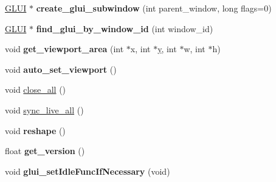 \begin{DoxyCompactItemize}
\item 
\hypertarget{class_g_l_u_i___master___object_a124da0ebe0097f3a3b2490b871c5c7a7}{\hyperlink{class_g_l_u_i}{G\+L\+U\+I} $\ast$ {\bfseries create\+\_\+glui\+\_\+subwindow} (int parent\+\_\+window, long flags=0)}\label{class_g_l_u_i___master___object_a124da0ebe0097f3a3b2490b871c5c7a7}

\item 
\hypertarget{class_g_l_u_i___master___object_ae6910731efd0ad41430ded9e88aa8315}{\hyperlink{class_g_l_u_i}{G\+L\+U\+I} $\ast$ {\bfseries find\+\_\+glui\+\_\+by\+\_\+window\+\_\+id} (int window\+\_\+id)}\label{class_g_l_u_i___master___object_ae6910731efd0ad41430ded9e88aa8315}

\item 
\hypertarget{class_g_l_u_i___master___object_a2bee4bcbf463ab57f6da65eeb9a93ee8}{void {\bfseries get\+\_\+viewport\+\_\+area} (int $\ast$x, int $\ast$\hyperlink{_ice_utils_8h_aa7ffaed69623192258fb8679569ff9ba}{y}, int $\ast$w, int $\ast$h)}\label{class_g_l_u_i___master___object_a2bee4bcbf463ab57f6da65eeb9a93ee8}

\item 
\hypertarget{class_g_l_u_i___master___object_ad62e7468e51d92ac67617f1968b1c944}{void {\bfseries auto\+\_\+set\+\_\+viewport} ()}\label{class_g_l_u_i___master___object_ad62e7468e51d92ac67617f1968b1c944}

\item 
void \hyperlink{class_g_l_u_i___master___object_ad2f380184ab29c1817f1ad3b25b36fd5}{close\+\_\+all} ()
\item 
void \hyperlink{class_g_l_u_i___master___object_a6fb29a6080a45d364fc4653591cb1ade}{sync\+\_\+live\+\_\+all} ()
\item 
\hypertarget{class_g_l_u_i___master___object_a8e092dea6e4ae3a6b52c8cba92eeefb4}{void {\bfseries reshape} ()}\label{class_g_l_u_i___master___object_a8e092dea6e4ae3a6b52c8cba92eeefb4}

\item 
\hypertarget{class_g_l_u_i___master___object_ad4654282669300f569d30a4c430f4e6f}{float {\bfseries get\+\_\+version} ()}\label{class_g_l_u_i___master___object_ad4654282669300f569d30a4c430f4e6f}

\item 
\hypertarget{class_g_l_u_i___master___object_af9b11cec3c215c6acc1de9bf8e0d92f3}{void {\bfseries glui\+\_\+set\+Idle\+Func\+If\+Necessary} (void)}\label{class_g_l_u_i___master___object_af9b11cec3c215c6acc1de9bf8e0d92f3}

\end{DoxyCompactItemize}
